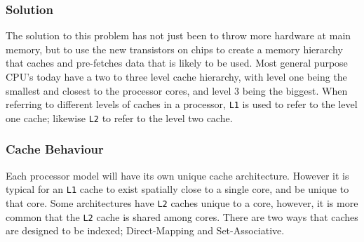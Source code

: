\documentclass[bsc,frontabs,twoside,singlespacing,parskip,deptreport]{infthesis}     %
\begin{document}
\subsubsection{Solution}
The solution to this problem has not just been to throw more hardware at main memory, but to use the new transistors on chips to create a memory hierarchy that caches and pre-fetches data that is likely to be used. Most general purpose CPU's today have a two to three level cache hierarchy, with level one being the smallest and closest to the processor cores, and level 3 being the biggest. When referring to different levels of caches in a processor, \texttt{L1} is used to refer to the level one cache; likewise \texttt{L2} to refer to the level two cache.
\par
\subsubsection{Cache Behaviour}
Each processor model will have its own unique cache architecture. However it is typical for an \texttt{L1} cache to exist spatially close to a single core, and be unique to that core. Some architectures have \texttt{L2} caches unique to a core, however, it is more common that the \texttt{L2} cache is shared among cores. There are two ways that caches are designed to be indexed; Direct-Mapping and Set-Associative.
\end{document}
